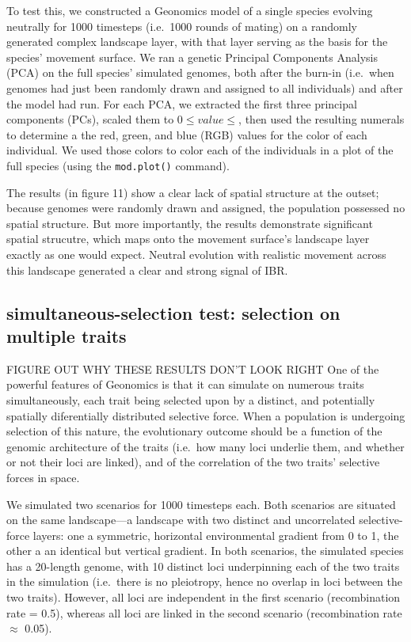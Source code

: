 ﻿\documentclass{article}
\begin{document}
To test this, we constructed a Geonomics model of a single species evolving neutrally
for 1000 timesteps (i.e.\ 1000 rounds of mating) on a randomly generated complex landscape layer,
with that layer serving as the basis for the species' movement surface.
We ran a genetic Principal Components Analysis (PCA) on the full species' simulated genomes,
both after the burn-in (i.e.\ when genomes had just been randomly drawn and assigned to all individuals)
and after the model had run. For each PCA, we extracted the first three principal components (PCs),
scaled them to $0\leq value\leq$, then used the resulting numerals to determine a the
red, green, and blue (RGB) values for the color of each individual.
We used those colors to color each of the individuals in a plot of the full species (using the \texttt{mod.plot()} command).

The results (in figure 11) show a clear lack of spatial structure at the outset; because genomes were randomly drawn and assigned,
the population possessed no spatial structure. But more importantly, the results demonstrate significant
spatial strucutre, which maps onto the movement surface's landscape layer exactly as one would expect.
Neutral evolution with realistic movement across this landscape generated a clear and strong signal of IBR.

\subsection{simultaneous-selection test: selection on multiple traits}
{\large FIGURE OUT WHY THESE RESULTS DON'T LOOK RIGHT}
One of the powerful features of Geonomics is that it can simulate on numerous traits simultaneously,
each trait being selected upon by a distinct, and potentially spatially diferentially distributed selective force.
When a population is undergoing selection of this nature, the evolutionary outcome should be a function of the
genomic architecture of the traits (i.e.\ how many loci underlie them, and whether or not their loci are linked),
and of the correlation of the two traits' selective forces in space.

We simulated two scenarios for 1000 timesteps each. Both scenarios are situated on the same
landscape---a landscape with two distinct and uncorrelated selective-force layers: 
one a symmetric, horizontal environmental gradient from 0 to 1, the other a
an identical but vertical gradient.
In both scenarios, the simulated species has a 20-length genome, with 10 distinct loci underpinning
each of the two traits in the simulation (i.e.\ there is no pleiotropy, hence no overlap
in loci between the two traits). However, all loci are independent in the first scenario (recombination
rate = 0.5), whereas all loci are linked in the second scenario (recombination rate $\approx$ 0.05).
\end{document}
